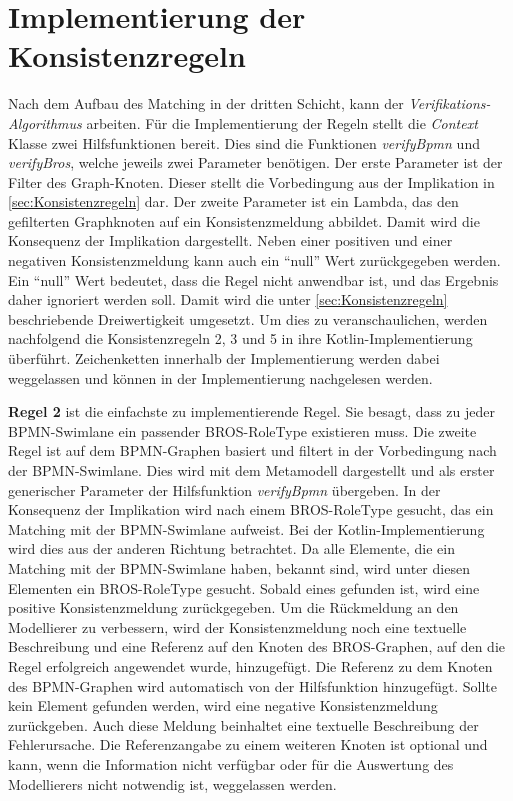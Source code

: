 \pagebreak
\section{Implementierung der Konsistenzregeln}
\label{sec:implementaion_consistency_rules}

Nach dem Aufbau des Matching in der dritten Schicht, kann der \emph{Verifikations-Algorithmus} arbeiten.
Für die Implementierung der Regeln stellt die \emph{Context} Klasse zwei Hilfsfunktionen bereit.
Dies sind die Funktionen \emph{verifyBpmn} und \emph{verifyBros}, welche jeweils zwei Parameter benötigen.
Der erste Parameter ist der Filter des Graph-Knoten.
Dieser stellt die Vorbedingung aus der Implikation in \cref{sec:Konsistenzregeln} dar.
Der zweite Parameter ist ein Lambda, das den gefilterten Graphknoten auf ein Konsistenzmeldung abbildet.
Damit wird die Konsequenz der Implikation dargestellt.
Neben einer positiven und einer negativen Konsistenzmeldung kann auch ein ``null'' Wert zurückgegeben werden.
Ein ``null'' Wert bedeutet, dass die Regel nicht anwendbar ist, und das Ergebnis daher ignoriert werden soll.
Damit wird die unter \cref{sec:Konsistenzregeln} beschriebende Dreiwertigkeit umgesetzt.
Um dies zu veranschaulichen, werden nachfolgend die Konsistenzregeln 2, 3 und 5 in ihre Kotlin-Implementierung überführt.
Zeichenketten innerhalb der Implementierung werden dabei weggelassen und können in der Implementierung nachgelesen werden.

\textbf{Regel 2} ist die einfachste zu implementierende Regel.
Sie besagt, dass zu jeder BPMN-Swimlane ein passender BROS-RoleType existieren muss.
Die zweite Regel ist auf dem BPMN-Graphen basiert und filtert in der Vorbedingung nach der BPMN-Swimlane.
Dies wird mit dem Metamodell dargestellt und als erster generischer Parameter der Hilfsfunktion \emph{verifyBpmn} übergeben.
In der Konsequenz der Implikation wird nach einem BROS-RoleType gesucht, das ein Matching mit der BPMN-Swimlane aufweist.
Bei der Kotlin-Implementierung wird dies aus der anderen Richtung betrachtet.
Da alle Elemente, die ein Matching mit der BPMN-Swimlane haben, bekannt sind, wird unter diesen Elementen ein BROS-RoleType gesucht.
Sobald eines gefunden ist, wird eine positive Konsistenzmeldung zurückgegeben.
Um die Rückmeldung an den Modellierer zu verbessern, wird der Konsistenzmeldung noch eine textuelle Beschreibung und eine Referenz auf den Knoten des BROS-Graphen, auf den die Regel erfolgreich angewendet wurde, hinzugefügt.
Die Referenz zu dem Knoten des BPMN-Graphen wird automatisch von der Hilfsfunktion hinzugefügt.
Sollte kein Element gefunden werden, wird eine negative Konsistenzmeldung zurückgeben.
Auch diese Meldung beinhaltet eine textuelle Beschreibung der Fehlerursache.
Die Referenzangabe zu einem weiteren Knoten ist optional und kann, wenn die Information nicht verfügbar oder für die Auswertung des Modellierers nicht notwendig ist, weggelassen werden.

